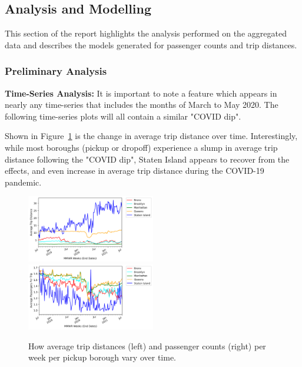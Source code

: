 \documentclass[11pt]{article}
\begin{document}
\subsection{Analysis and Modelling}

This section of the report highlights the analysis performed on the aggregated data
and describes the models generated for passenger counts and trip distances.

\subsubsection{Preliminary Analysis}

\textbf{Time-Series Analysis:}
It is important to note 
a feature which appears in nearly any time-series that includes 
the months of March to May 2020. 
The following time-series plots will all contain a similar "COVID dip".

Shown in Figure~\ref{fig:ts} is the change in average trip distance over time. Interestingly, 
while most boroughs (pickup or dropoff) experience a slump in average trip distance following the "COVID dip", 
Staten Island appears to recover from the effects, and even increase in average trip distance
during the COVID-19 pandemic.

    \begin{figure}[H]
        \includegraphics[width=0.5\textwidth]{../plots/time-series-Average Trip Distance-vs-MMWR Weeks (End Dates)-by-pu_borough.png}
        \includegraphics[width=0.5\textwidth]{../plots/time-series-Average Passengers Per Trip-vs-MMWR Weeks (End Dates)-by-pu_borough.png}

        \centering
        \caption{How average trip distances (left) and passenger counts (right) per week per pickup borough vary over time.} %
        \label{fig:ts}
    \end{figure}
\end{document}
